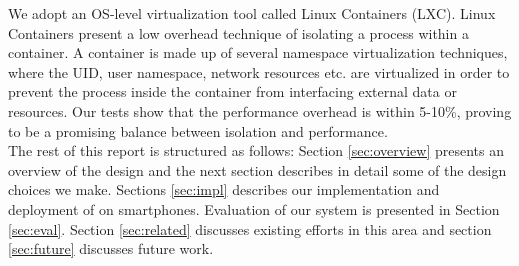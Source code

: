 We adopt an OS-level virtualization tool called Linux Containers (LXC). Linux Containers present a low overhead technique of isolating a process within a container.  A container is made up of several namespace virtualization techniques, where the UID, user namespace, network resources etc. are virtualized in order to prevent the process inside the container from interfacing external data or resources.  Our tests show that the performance overhead is within 5-10\%, proving to be a promising balance between isolation and performance. \\

The rest of this report is structured as follows: Section \ref{sec:overview} presents an overview of the design and the next section describes in detail some of the design choices we make. Sections \ref{sec:impl} describes our implementation and deployment of \emph{\proj} on smartphones. Evaluation of our system is presented in Section \ref{sec:eval}. Section \ref{sec:related} discusses existing efforts in this area and section \ref{sec:future} discusses future work.\\

